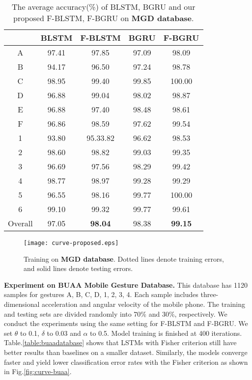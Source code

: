 \documentclass[review]{elsarticle}
\begin{document}
\begin{table*}[htp]
	\centering
	\caption{The average accuracy(\%) of BLSTM, BGRU and our proposed F-BLSTM, F-BGRU on \textbf{{MGD} database}.}
	\label{table:ourdatabase}
	\vspace*{6pt}
	\begin{tabular}{||c||c|c||c|c||}
		\hline
		\diagbox{\textbf{Gesture}}{\textbf{Method}} & BLSTM & F-BLSTM & BGRU & F-BGRU\\
		\hline
		A & 97.41 & 97.85 & 97.09 & 98.09 \\ B & 94.17 & 96.50 & 97.24 & 98.78 \\ C & 98.95 & 99.40 & 99.85 & 100.00 \\ D & 96.88 & 99.04 & 98.02 & 98.87 \\ E & 96.88 & 97.40 & 98.48 & 98.61 \\ F & 96.86 & 98.59 & 97.62 & 99.54 \\ 1 & 93.80 & 95.33.82 & 96.62 & 98.53 \\ 2 & 98.60 & 98.82 & 99.03 & 99.35 \\ 3 & 96.69 & 97.56 & 98.29 & 99.42 \\ 4 & 98.77 & 98.97 & 99.28 & 99.29 \\ 5 & 96.55 & 98.16 & 99.77 & 100.00 \\ 6 & 99.10 & 99.32 & 99.77 & 99.61 \\ \hline
		Overall & 97.05 & \textbf{98.04} & 98.38 & \textbf{99.15} \\ \hline
	\end{tabular}
\end{table*}

\begin{figure*}[htbp]
	\normalsize
	\centering
	\texttt{[image: curve-proposed.eps]}
	\caption{Training on \textbf{{MGD} database}. Dotted lines denote training errors, and solid lines denote testing errors. }
	\label{fig:curve-proposed}
	\vspace*{4pt}
\end{figure*}

\textbf{Experiment on BUAA Mobile Gesture Database\;\cite{xie2016ccbr}.}
This database has 1120 samples for gestures A, B, C, D, 1, 2, 3, 4. Each sample includes three-dimensional acceleration and angular velocity of the mobile phone. The training and testing sets are divided randomly into 70\% and 30\%, respectively. We conduct the experiments using the same setting for F-BLSTM and F-BGRU. We set $\theta$ to 0.1, $\delta$ to 0.03 and $\alpha$ to 0.5. Model training is finished at 400 iterations. Table.\;\ref{table:buaadatabase} shows that LSTMs with Fisher criterion still have better results than baselines on a smaller dataset. Similarly, the models converge faster and yield lower classification error rates with the Fisher criterion as shown in Fig.\;\ref{fig:curve-buaa}.
\end{document}
